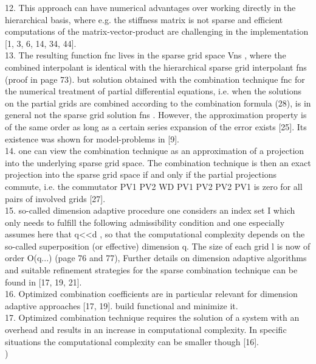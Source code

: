 12. This approach can have numerical advantages over working directly in the hierarchical basis, where e.g. the stiffness matrix is not sparse and efficient computations of the matrix-vector-product are challenging in the implementation [1, 3, 6, 14, 34, 44].\cite{Garcke2013}\\

13. The resulting function fnc lives in the sparse grid space Vns , where the combined interpolant is identical with the hierarchical sparse grid interpolant fns (proof in page 73). but solution obtained with the combination technique fnc for the numerical treatment of partial differential equations, i.e. when the solutions on the partial grids are combined according to the combination formula (28), is in general not the sparse grid solution fns . However, the approximation property is of the same order as long as a certain series expansion of the error exists [25]. Its existence was shown for model-problems in [9].\cite{Garcke2013}\\ %

14. one can view the combination technique as an approximation of a projection into the underlying sparse grid space. The combination technique is then an exact projection into the sparse grid space if and only if the partial projections commute, i.e. the commutator PV1  PV2   WD PV1 PV2   PV2 PV1 is zero for all pairs of involved grids [27].\cite{Garcke2013}\\

15. so-called dimension adaptive procedure one considers an index set I which only needs to fulfill the following admissibility condition and one especially assumes here that q<<d , so that the computational complexity depends on the so-called superposition (or effective) dimension q. The size of each grid l is now of order O(q...)  (page 76 and 77), Further details on dimension adaptive algorithms and suitable refinement strategies for the sparse combination technique can be found in [17, 19, 21]. \cite{Garcke2013}\\

16. Optimized combination coefficients are in particular relevant for dimension adaptive approaches [17, 19]. build functional and minimize it. \cite{Garcke2013}\\

17. Optimized combination technique requires the solution of a system with an overhead and results in an increase in computational complexity. In specific situations the computational complexity can be smaller though [16].\cite{Garcke2013}\\
)\\
